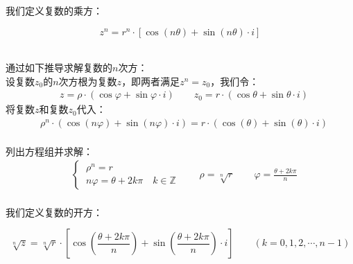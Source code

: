 \documentclass[UTF8]{ctexart}
\begin{document}
    我们定义复数的乘方：
    \begin{large}
        \begin{equation*}
            z^n=r^n\cdot[\cos{(n\theta)}+\sin{(n\theta)}\cdot i]
        \end{equation*}
    \end{large}\\
    通过如下推导求解复数的$n$次方：\\[3mm]
    设复数$z_0$的$n$次方根为复数$z$，即两者满足$z^n=z_0$，我们令：
    \setcounter{equation}{0}
    \begin{align}
        &z=\rho\cdot(\cos{\varphi}+\sin{\varphi}\cdot i)\qquad
        z_0=r\cdot(\cos{\theta}+\sin{\theta}\cdot i)
    \end{align}
    将复数$z$和复数$z_0$代入：
    \begin{align}
        &\rho^n\cdot(\cos{(n\varphi)}+\sin{(n\varphi)}\cdot i)=r\cdot(\cos{(\theta)}+\sin{(\theta)}\cdot i)
    \end{align}\\
    列出方程组并求解：
    \begin{align}
        &\begin{cases}
            ~\rho^n=r\\
            ~n\varphi=\theta+2k\pi\quad k\in\mathbb{Z}
        \end{cases}\qquad
        \rho=\sqrt[n]{r}\qquad\varphi=\frac{\theta+2k\pi}{n}
    \end{align}\\
    我们定义复数的开方：\vspace{3pt}
    \begin{large}
        \begin{equation*}
            \sqrt[n]{z}=\sqrt[n]{r}\cdot\left[\cos{\left(\frac{\theta+2k\pi}{n}\right)}+\sin{\left(\frac{\theta+2k\pi}{n}\right)\cdot i}\right]\qquad\left(k=0,1,2,\cdots,n-1\right)
        \end{equation*}
    \end{large}

\newpage
\end{document}
